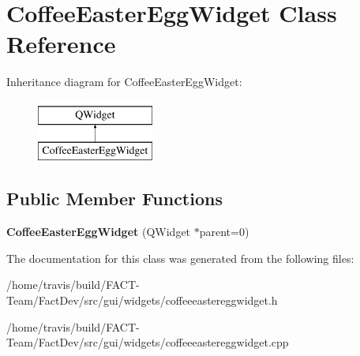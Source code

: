 \hypertarget{classCoffeeEasterEggWidget}{\section{Coffee\-Easter\-Egg\-Widget Class Reference}
\label{classCoffeeEasterEggWidget}
}
Inheritance diagram for Coffee\-Easter\-Egg\-Widget\-:\begin{figure}[H]
\begin{center}
\leavevmode
\includegraphics[height=2.000000cm]{d8/d3f/classCoffeeEasterEggWidget}
\end{center}
\end{figure}
\subsection*{Public Member Functions}
\begin{DoxyCompactItemize}
\item 
\hypertarget{classCoffeeEasterEggWidget_ae688b5388b66dd7e3113cddf46d69c8c}{{\bfseries Coffee\-Easter\-Egg\-Widget} (Q\-Widget $\ast$parent=0)}\label{classCoffeeEasterEggWidget_ae688b5388b66dd7e3113cddf46d69c8c}

\end{DoxyCompactItemize}


The documentation for this class was generated from the following files\-:\begin{DoxyCompactItemize}
\item 
/home/travis/build/\-F\-A\-C\-T-\/\-Team/\-Fact\-Dev/src/gui/widgets/coffeeeastereggwidget.\-h\item 
/home/travis/build/\-F\-A\-C\-T-\/\-Team/\-Fact\-Dev/src/gui/widgets/coffeeeastereggwidget.\-cpp\end{DoxyCompactItemize}
